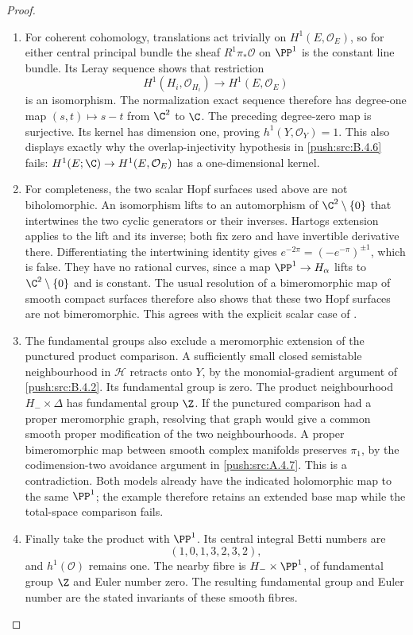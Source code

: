 \begin{proof}
\begin{enumerate}[label=\arabic*.,leftmargin=*]
\item For coherent cohomology, translations act trivially on
$H^1(E,\mathcal O_E)$, so for either central principal bundle
the sheaf $R^1\pi_*\mathcal O$ on $\PP^1$ is the constant
line bundle.  Its Leray sequence shows that restriction
\[
 H^1(H_i,\mathcal O_{H_i})\longrightarrow H^1(E,\mathcal O_E)
\]
is an isomorphism.  The normalization exact sequence therefore
has degree-one map $(s,t)\mapsto s-t$ from $\C^2$ to $\C$.
The preceding degree-zero map is surjective.  Its kernel has
dimension one, proving $h^1(Y,\mathcal O_Y)=1$.
This also displays exactly why the overlap-injectivity hypothesis
in \ref{push:src:B.4.6} fails: $H^1(E;\C)\to H^1(E,\mathcal O_E)$ has a
one-dimensional kernel.

\item For completeness, the two scalar Hopf surfaces used above are
not biholomorphic.  An isomorphism lifts to an automorphism of
$\C^2\setminus\{0\}$ that intertwines the two cyclic generators
or their inverses.  Hartogs extension applies to the lift and
its inverse; both fix zero and have invertible derivative there.
Differentiating the intertwining identity gives
$e^{-2\pi}=(-e^{-\pi})^{\pm1}$, which is false.  They have
no rational curves, since a map $\PP^1\to H_\alpha$ lifts to
$\C^2\setminus\{0\}$ and is constant.  The usual resolution
of a bimeromorphic map of smooth compact surfaces therefore
also shows that these two Hopf surfaces are not bimeromorphic.
This agrees with the explicit scalar case of
\citet[arXiv version~1, Section~2.2, pp.~4--5]{AbashevaDeev2024AB}.

\item The fundamental groups also exclude a meromorphic
extension of the punctured product comparison. A sufficiently
small closed semistable neighbourhood in $\mathcal H$ retracts
onto $Y$, by the monomial-gradient argument of \ref{push:src:B.4.2}.  Its
fundamental group is zero.  The product neighbourhood
$H_-\times\Delta$ has fundamental group $\Z$.  If the
punctured comparison had a proper meromorphic graph, resolving
that graph would give a common smooth proper modification of
the two neighbourhoods.  A proper bimeromorphic map between
smooth complex manifolds preserves $\pi_1$, by the
codimension-two avoidance argument in \ref{push:src:A.4.7}.  This is a
contradiction.  Both models already have the indicated
holomorphic map to the same $\PP^1$; the example therefore
retains an extended base map while the total-space comparison
fails.

\item Finally take the product with $\PP^1$.  Its central integral
Betti numbers are
\[
 (1,0,1,3,2,3,2),
\]
and $h^1(\mathcal O)$ remains one.  The nearby fibre is
$H_-\times\PP^1$, of fundamental group $\Z$ and Euler
number zero.  The resulting fundamental group and Euler number are the stated
invariants of these smooth fibres.
\end{enumerate}
\end{proof}